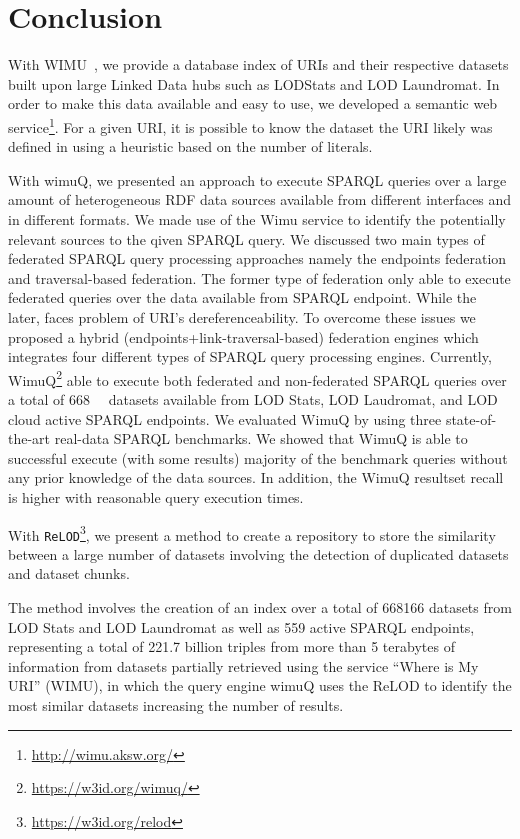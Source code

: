 \documentclass[sw]{iosart2x}
\begin{document}
\section{Conclusion}
\label{sec:conc}

With WIMU~\cite{valdestilhas2018my}, we provide a database index of URIs and their respective datasets built upon large Linked Data hubs such as LODStats and LOD Laundromat.
In order to make this data available and easy to use, we developed a semantic web service\footnote{\url{http://wimu.aksw.org/}}.
For a given URI, it is possible to know the dataset the URI likely was defined in using a heuristic based on the number of literals.

With wimuQ\cite{valdestilhas2019more}, we presented an approach to execute SPARQL queries over a large amount of heterogeneous RDF data sources available from different interfaces and in different formats. We made use of the Wimu service to identify the potentially relevant sources to the qiven SPARQL query. We discussed two main types of federated SPARQL query processing approaches namely the endpoints federation and traversal-based federation. The former type of federation only able to execute federated queries over the data available from SPARQL endpoint. While the later, faces problem of URI's dereferenceability. To overcome these issues we proposed a hybrid (endpoints+link-traversal-based) federation engines which integrates four different types of SPARQL query processing engines. Currently, WimuQ\footnote{\url{https://w3id.org/wimuq/}} able to execute both federated and non-federated SPARQL queries over a total of \SI{668}{\kilo\nothing} datasets available from LOD Stats, LOD Laudromat, and LOD cloud active SPARQL endpoints. We evaluated WimuQ by using three state-of-the-art real-data SPARQL benchmarks. We showed that WimuQ is able to successful execute (with some results) majority of the benchmark queries without any prior knowledge of the data sources. In addition, the WimuQ resultset recall is higher with reasonable query execution times. 

With \texttt{ReLOD}\footnote{\url{https://w3id.org/relod}}, we present a method to create a repository to store the similarity between a large number of datasets involving the detection of duplicated datasets and dataset chunks.

The method involves the creation of an index over a total of \num{668166} datasets from LOD Stats and LOD Laundromat as well as 559 active SPARQL endpoints, representing a total of 221.7 billion triples from more than 5 terabytes of information from datasets partially retrieved using the service ``Where is My URI'' (WIMU)\cite{valdestilhas2018my}, in which the query engine wimuQ\cite{valdestilhas2019more} uses the ReLOD to identify the most similar datasets increasing the number of results. 
\end{document}
